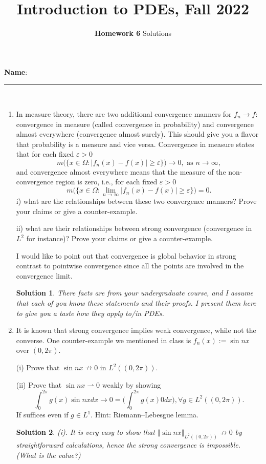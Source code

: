 \documentclass[6pt]{article}
\title{Introduction to PDEs, Fall 2022}
\author{\textbf{Homework 6} Solutions}
\date{}
\newtheorem{solution}{Solution}
\numberwithin{equation}{section}
\begin{document}
\maketitle

\textbf{Name}:\rule{1 in}{0.001 in} \\


\begin{enumerate}
\item In measure theory, there are two additional convergence manners for $f_n\rightarrow f$: convergence in measure (called convergence in probability) and convergence almost everywhere (convergence almost surely).  This should give you a flavor that probability is a measure and vice versa.  Convergence in measure states that for each fixed $\varepsilon>0$
    \[m\big(\{x\in\Omega: |f_n(x)-f(x)|\geq\varepsilon\}\big)\rightarrow 0, \text{~as~}n\rightarrow \infty,\]
    and convergence almost everywhere means that the measure of the non-convergence region is zero, i.e., for each fixed $\varepsilon>0$
    \[m\big(\{x\in\Omega: \lim_{n\rightarrow\infty}|f_n(x)-f(x)|\geq\varepsilon\}\big)=0.\]
i) what are the relationships between these two convergence manners?  Prove your claims or give a counter-example.

ii) what are their relationships between strong convergence (convergence in $L^2$ for instance)?  Prove your claims or give a counter-example.

I would like to point out that convergence is global behavior in strong contrast to pointwise convergence since all the points are involved in the convergence limit.
\begin{solution}
There facts are from your undergraduate course, and I assume that each of you know these statements and their proofs.  I present them here to give you a taste how they apply to/in PDEs.
\end{solution}



\item  It is known that strong convergence implies weak convergence, while not the converse.  One counter-example we mentioned in class is $f_n(x):=\sin nx$ over $(0,2\pi)$.

(i)  Prove that $\sin nx \nrightarrow 0 $ in $L^2((0,2\pi))$.

(ii)  Prove that
$\sin nx \rightharpoonup 0$ weakly by showing
\[\int_0^{2\pi} g(x)\sin nx dx\rightarrow 0=\Big(\int_0^{2\pi} g(x)0  dx\Big),\forall g\in L^2((0,2\pi)).\]
If suffices even if $g\in L^1$.  Hint: Riemann--Lebesgue lemma.
\begin{solution}
(i).  It is very easy to show that $\Vert \sin nx\Vert_{L^2((0,2\pi))}\not \rightarrow 0$ by straightforward calculations, hence the strong convergence is impossible.  (What is the value?)


\end{solution}
\end{enumerate}
\end{document}
